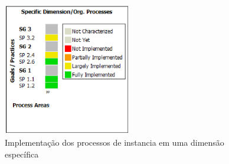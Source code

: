 \documentclass[a4paper, 11pt]{article}
\begin{document}
\begin{figure}[h]
  \centering
  \includegraphics[width=0.5\textwidth]{figuras/instantiation_specific.eps}
  \caption{Implementação dos processos de instancia em uma dimensão
  específica}
  \label{fig:instantiation_specific}
\end{figure}
\end{document}
